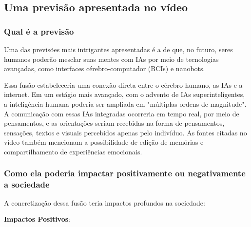 \documentclass[a4paper,12pt]{article}
\begin{document}
\subsection{Uma previsão apresentada no vídeo}

\subsubsection{Qual é a previsão}

Uma das previsões mais intrigantes apresentadas é a de que, no futuro, seres humanos poderão mesclar suas mentes com IAs por meio de tecnologias avançadas, como interfaces cérebro-computador (BCIs) e nanobots.

Essa fusão estabeleceria uma conexão direta entre o cérebro humano, as IAs e a internet. Em um estágio mais avançado, com o advento de IAs superinteligentes, a inteligência humana poderia ser ampliada em "múltiplas ordens de magnitude". A comunicação com essas IAs integradas ocorreria em tempo real, por meio de pensamentos, e as orientações seriam recebidas na forma de pensamentos, sensações, textos e visuais percebidos apenas pelo indivíduo. As fontes citadas no vídeo também mencionam a possibilidade de edição de memórias e compartilhamento de experiências emocionais.

\subsubsection{Como ela poderia impactar positivamente ou negativamente a sociedade}

A concretização dessa fusão teria impactos profundos na sociedade:

\textbf{Impactos Positivos}:
\end{document}
